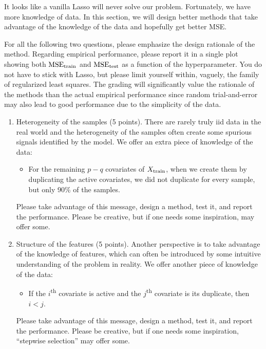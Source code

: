 \documentclass{article}
\begin{document}
It looks like a vanilla Lasso will never solve our problem. 
Fortunately, we have more knowledge of data. 
In this section, we will design better methods that take advantage of the knowledge of the data and hopefully get better MSE. 

For all the following two questions, please emphasize the design rationale of the method. 
Regarding empirical performance, please report it in a single plot showing both $ \textnormal{MSE}_{\textnormal{train}} $ and $ \textnormal{MSE}_{\textnormal{test}} $ as a function of the hyperparameter. 
You do not have to stick with Lasso, but please limit yourself within, vaguely, the family of regularized least squares. 
The grading will significantly value the rationale of the methods than the actual empirical performance since random trial-and-error may also lead to good performance due to the simplicity of the data. 


\begin{enumerate}
\item 
Heterogeneity of the samples (5 points).
There are rarely truly iid data in the real world and the heterogeneity of the samples often create some spurious signals identified by the model. 
We offer an extra piece of knowledge of the data: 
\begin{itemize}
\item For the remaining $p-q$ covariates of $X_{\textnormal{train}}$, when we create them by duplicating the active covariates, we did not duplicate for every sample, but only 90\% of the samples. 
\end{itemize}
Please take advantage of this message, design a method, test it, and report the performance. 
Please be creative, but if one needs some inspiration, \citep{meinshausen2010stability} may offer some. 

\item 
Structure of the features (5 points).
Another perspective is to take advantage of the knowledge of features, 
which can often be introduced by some intuitive understanding of the problem in reality. 
We offer another piece of knowledge of the data:
\begin{itemize}
\item If the $i$\textsuperscript{th} covariate is active and the $j$\textsuperscript{th} covariate is its duplicate, then $i<j$. 
\end{itemize}
Please take advantage of this message, design a method, test it, and report the performance. 
Please be creative, but if one needs some inspiration, ``stepwise selection'' may offer some.

\end{enumerate}
\end{document}
